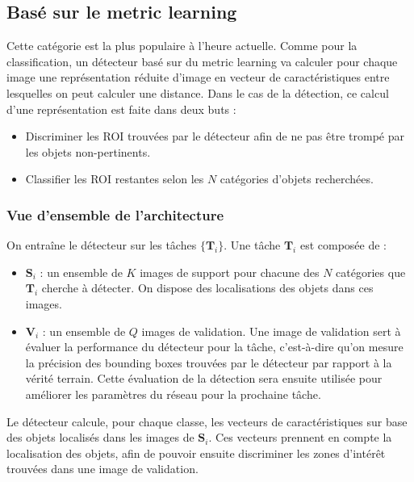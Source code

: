 \subsection{Basé sur le metric learning}
Cette catégorie est la plus populaire à l'heure actuelle. Comme pour la classification, un détecteur basé sur du metric learning va calculer pour chaque image une représentation réduite d'image en vecteur de caractéristiques entre lesquelles on peut calculer une distance. Dans le cas de la détection, ce calcul d'une représentation est faite dans deux buts :
\begin{itemize}
    \item Discriminer les ROI trouvées par le détecteur afin de ne pas être trompé par les objets non-pertinents.
    \item Classifier les ROI restantes selon les $N$ catégories d'objets recherchées.
\end{itemize}

\subsubsection*{Vue d'ensemble de l'architecture}
On entraîne le détecteur sur les tâches $\{\textbf{T}_i\}$. Une tâche $\textbf{T}_i$ est composée de :
\begin{itemize}
    \item $\textbf{S}_i$ : un ensemble de $K$ images de support pour chacune des $N$ catégories que $\textbf{T}_i$ cherche à détecter. On dispose des localisations des objets dans ces images.
    \item $\textbf{V}_i$ : un ensemble de $Q$ images de validation. Une image de validation sert à évaluer la performance du détecteur pour la tâche, c'est-à-dire qu'on mesure la précision des bounding boxes trouvées par le détecteur par rapport à la vérité terrain. Cette évaluation de la détection sera ensuite utilisée pour améliorer les paramètres du réseau pour la prochaine tâche.
\end{itemize}

Le détecteur calcule, pour chaque classe, les vecteurs de caractéristiques sur base des objets localisés dans les images de $\textbf{S}_i$. Ces vecteurs prennent en compte la localisation des objets, afin de pouvoir ensuite discriminer les zones d'intérêt trouvées dans une image de validation.

